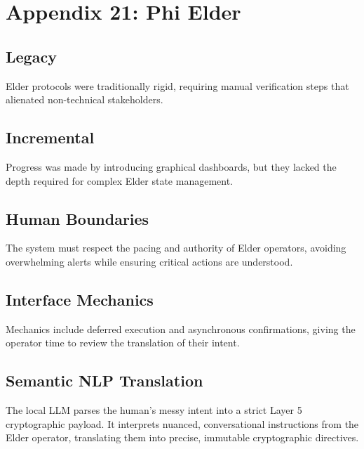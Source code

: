 \chapter{Appendix 21: Phi Elder}

\section{Legacy}
Elder protocols were traditionally rigid, requiring manual verification steps that alienated non-technical stakeholders.

\section{Incremental}
Progress was made by introducing graphical dashboards, but they lacked the depth required for complex Elder state management.

\section{Human Boundaries}
The system must respect the pacing and authority of Elder operators, avoiding overwhelming alerts while ensuring critical actions are understood.

\section{Interface Mechanics}
Mechanics include deferred execution and asynchronous confirmations, giving the operator time to review the translation of their intent.

\section{Semantic NLP Translation}
The local LLM parses the human's messy intent into a strict Layer 5 cryptographic payload. It interprets nuanced, conversational instructions from the Elder operator, translating them into precise, immutable cryptographic directives.

